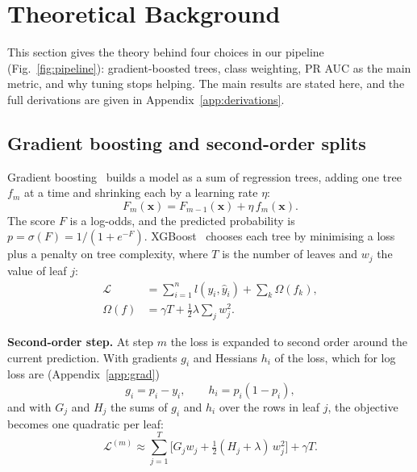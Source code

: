 
\section{Theoretical Background}
\label{sec:theory}

This section gives the theory behind four choices in our pipeline (Fig.~\ref{fig:pipeline}):
gradient-boosted trees, class weighting, PR AUC as the main metric, and why tuning stops helping. The
main results are stated here, and the full derivations are given in Appendix~\ref{app:derivations}.

\subsection{Gradient boosting and second-order splits}
\label{sec:theory_gb}

Gradient boosting~\cite{friedman2001} builds a model as a sum of regression trees, adding one tree $f_m$
at a time and shrinking each by a learning rate $\eta$:
\begin{equation}
F_m(\mathbf{x}) = F_{m-1}(\mathbf{x}) + \eta\, f_m(\mathbf{x}) .
\label{eq:additive}
\end{equation}
The score $F$ is a log-odds, and the predicted probability is $p = \sigma(F) = 1/(1+e^{-F})$.
XGBoost~\cite{chen2016} chooses each tree by minimising a loss plus a penalty on tree complexity, where
$T$ is the number of leaves and $w_j$ the value of leaf $j$:
\begin{align}
\mathcal{L} &= \sum_{i=1}^{n} l(y_i, \hat{y}_i) + \sum_{k} \Omega(f_k), \label{eq:objective}\\
\Omega(f) &= \gamma T + \tfrac{1}{2}\lambda \textstyle\sum_{j} w_j^2 . \label{eq:omega}
\end{align}

\textbf{Second-order step.} At step $m$ the loss is expanded to second order around the current
prediction. With gradients $g_i$ and Hessians $h_i$ of the loss, which for log loss are
(Appendix~\ref{app:grad})
\begin{equation}
g_i = p_i - y_i, \qquad h_i = p_i(1-p_i),
\label{eq:gh}
\end{equation}
and with $G_j$ and $H_j$ the sums of $g_i$ and $h_i$ over the rows in leaf $j$, the objective becomes
one quadratic per leaf:
\begin{equation}
\mathcal{L}^{(m)} \approx \sum_{j=1}^{T} \Big[ G_j w_j + \tfrac{1}{2}(H_j + \lambda)\, w_j^2 \Big] + \gamma T .
\label{eq:leafsum}
\end{equation}

